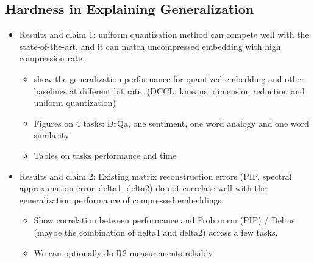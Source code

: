 \subsection{Hardness in Explaining Generalization}
\label{subsec:hard_explain}
	\begin{itemize}
		\item Results and claim 1: uniform quantization method can compete well with the state-of-the-art, and it can match uncompressed embedding with high compression rate.
		\begin{itemize}
			\item show the generalization performance for quantized embedding and other baselines at different bit rate. (DCCL, kmeans, dimension reduction and uniform quantization)
			\item Figures on 4 tasks: DrQa, one sentiment, one word analogy and one word similarity
			\item Tables on tasks performance and time
		\end{itemize}
		\item Results and claim 2: Existing matrix reconstruction errors (PIP, spectral approximation error--delta1, delta2) do not correlate well with the generalization performance of compressed embeddings.
		\begin{itemize}
			\item Show correlation between performance and Frob norm (PIP) / Deltas (maybe the combination of delta1 and delta2) across a few tasks.
			\item We can optionally do R2 measurements reliably
		\end{itemize}
	\end{itemize}